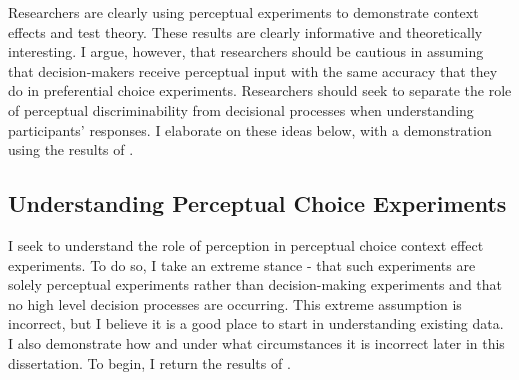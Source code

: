 Researchers are clearly using perceptual experiments to demonstrate context effects and test theory. These results are clearly informative and theoretically interesting. I argue, however, that researchers should be cautious in assuming that decision-makers receive perceptual input with the same accuracy that they do in preferential choice experiments. Researchers should seek to separate the role of perceptual discriminability from decisional processes when understanding participants' responses. I elaborate on these ideas below, with a demonstration using the results of \textcite{spektorWhenGoodLooks2018b}.

\subsection{Understanding Perceptual Choice Experiments}

I seek to understand the role of perception in perceptual choice context effect experiments. To do so, I take an extreme stance - that such experiments are solely perceptual experiments rather than decision-making experiments and that no high level decision processes are occurring. This extreme assumption is incorrect, but I believe it is a good place to start in understanding existing data. I also demonstrate how and under what circumstances it is incorrect later in this dissertation. To begin, I return the results of \textcite{spektorWhenGoodLooks2018b}. 

